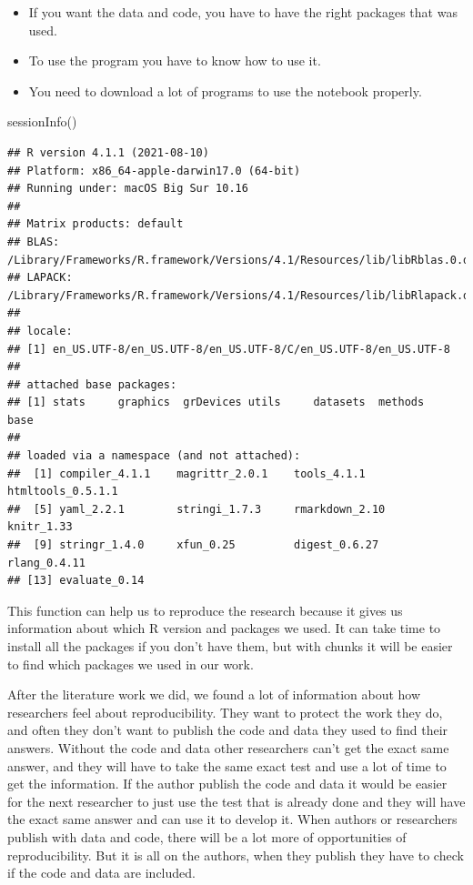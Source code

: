 \documentclass[
  12pt,
]{article}
\newenvironment{Shaded}{\begin{snugshade}}{\end{snugshade}}
\newcommand{\FunctionTok}[1]{\textcolor[rgb]{0.00,0.00,0.00}{#1}}
\newcommand{\NormalTok}[1]{#1}
\providecommand{\tightlist}{%
  \setlength{\itemsep}{0pt}\setlength{\parskip}{0pt}}
\begin{document}
\begin{itemize}
\tightlist
\item
  If you want the data and code, you have to have the right packages
  that was used.
\item
  To use the program you have to know how to use it.
\item
  You need to download a lot of programs to use the notebook properly.
\end{itemize}

\begin{Shaded}
\begin{Highlighting}[]
\FunctionTok{sessionInfo}\NormalTok{()}
\end{Highlighting}
\end{Shaded}

\begin{verbatim}
## R version 4.1.1 (2021-08-10)
## Platform: x86_64-apple-darwin17.0 (64-bit)
## Running under: macOS Big Sur 10.16
## 
## Matrix products: default
## BLAS:   /Library/Frameworks/R.framework/Versions/4.1/Resources/lib/libRblas.0.dylib
## LAPACK: /Library/Frameworks/R.framework/Versions/4.1/Resources/lib/libRlapack.dylib
## 
## locale:
## [1] en_US.UTF-8/en_US.UTF-8/en_US.UTF-8/C/en_US.UTF-8/en_US.UTF-8
## 
## attached base packages:
## [1] stats     graphics  grDevices utils     datasets  methods   base     
## 
## loaded via a namespace (and not attached):
##  [1] compiler_4.1.1    magrittr_2.0.1    tools_4.1.1       htmltools_0.5.1.1
##  [5] yaml_2.2.1        stringi_1.7.3     rmarkdown_2.10    knitr_1.33       
##  [9] stringr_1.4.0     xfun_0.25         digest_0.6.27     rlang_0.4.11     
## [13] evaluate_0.14
\end{verbatim}

This function can help us to reproduce the research because it gives us
information about which R version and packages we used. It can take time
to install all the packages if you don't have them, but with chunks it
will be easier to find which packages we used in our work.

After the literature work we did, we found a lot of information about
how researchers feel about reproducibility. They want to protect the
work they do, and often they don't want to publish the code and data
they used to find their answers. Without the code and data other
researchers can't get the exact same answer, and they will have to take
the same exact test and use a lot of time to get the information. If the
author publish the code and data it would be easier for the next
researcher to just use the test that is already done and they will have
the exact same answer and can use it to develop it. When authors or
researchers publish with data and code, there will be a lot more of
opportunities of reproducibility. But it is all on the authors, when
they publish they have to check if the code and data are included.
\end{document}
